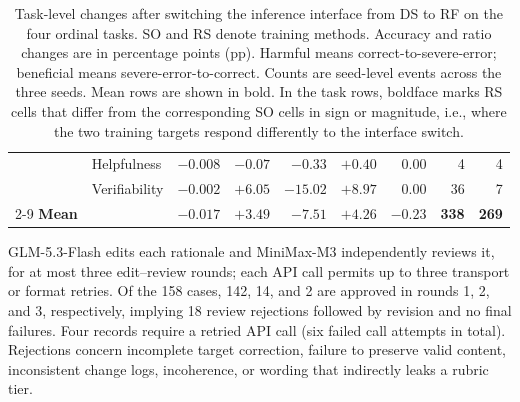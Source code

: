 \begin{table}[!tp]
\begin{tabular}{@{}llrrrrrrr@{}}
& Helpfulness
& $-0.008$ & $-0.07$ & $-0.33$ & $+0.40$ & $0.00$
& 4 & 4 \\

& Verifiability
& $\mathbf{-0.002}$ & $\mathbf{+6.05}$ & $\mathbf{-15.02}$
& $+8.97$ & $0.00$ & 36 & 7 \\

\cmidrule(l){2-9}
\textbf{Mean} &
& $\mathbf{-0.017}$
& $\mathbf{+3.49}$
& $\mathbf{-7.51}$
& $\mathbf{+4.26}$
& $\mathbf{-0.23}$
& \textbf{338}
& \textbf{269} \\

\bottomrule
\end{tabular}

\caption{Task-level changes after switching the inference interface from
DS to RF on the four ordinal tasks. SO and RS denote training methods.
Accuracy and ratio changes are in percentage points (pp). Harmful means
correct-to-severe-error; beneficial means severe-error-to-correct. Counts
are seed-level events across the three seeds. Mean rows are shown in bold.
In the task rows, boldface marks RS cells that differ from the corresponding
SO cells in sign or magnitude, i.e., where the two training targets respond
differently to the interface switch.}
\label{tab:full-interface-transitions}
\end{table}

GLM-5.3-Flash edits each rationale and MiniMax-M3 independently reviews it,
for at most three edit--review rounds; each API call permits up to three
transport or format retries. Of the 158 cases, 142, 14, and 2 are approved in
rounds 1, 2, and 3, respectively, implying 18 review rejections followed by
revision and no final failures. Four records require a retried API call
(six failed call attempts in total). Rejections concern incomplete target
correction, failure to preserve valid content, inconsistent change logs,
incoherence, or wording that indirectly leaks a rubric tier.

